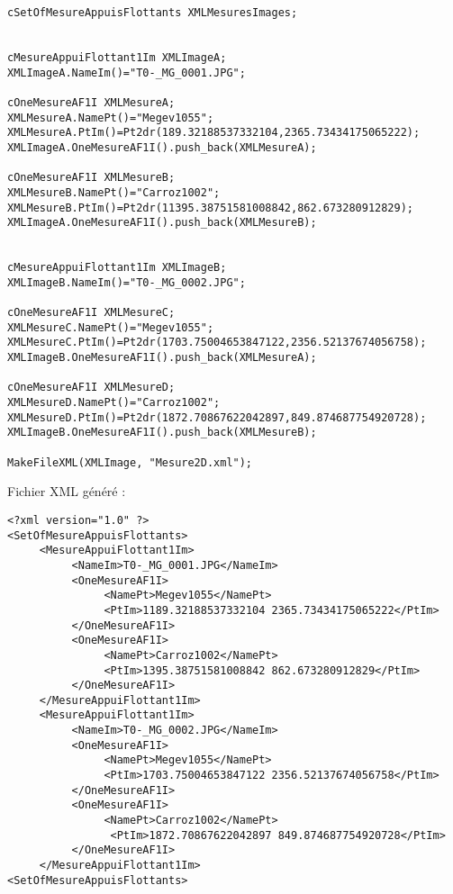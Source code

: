 \documentclass{article}
\begin{document}
\begin{verbatim}
cSetOfMesureAppuisFlottants XMLMesuresImages;
  

cMesureAppuiFlottant1Im XMLImageA;
XMLImageA.NameIm()="T0-_MG_0001.JPG";

cOneMesureAF1I XMLMesureA;
XMLMesureA.NamePt()="Megev1055";
XMLMesureA.PtIm()=Pt2dr(189.32188537332104,2365.73434175065222);
XMLImageA.OneMesureAF1I().push_back(XMLMesureA);

cOneMesureAF1I XMLMesureB;
XMLMesureB.NamePt()="Carroz1002";
XMLMesureB.PtIm()=Pt2dr(11395.38751581008842,862.673280912829);
XMLImageA.OneMesureAF1I().push_back(XMLMesureB);
			

cMesureAppuiFlottant1Im XMLImageB;
XMLImageB.NameIm()="T0-_MG_0002.JPG";

cOneMesureAF1I XMLMesureC;
XMLMesureC.NamePt()="Megev1055";
XMLMesureC.PtIm()=Pt2dr(1703.75004653847122,2356.52137674056758);
XMLImageB.OneMesureAF1I().push_back(XMLMesureA);

cOneMesureAF1I XMLMesureD;
XMLMesureD.NamePt()="Carroz1002";
XMLMesureD.PtIm()=Pt2dr(1872.70867622042897,849.874687754920728);
XMLImageB.OneMesureAF1I().push_back(XMLMesureB);

MakeFileXML(XMLImage, "Mesure2D.xml");

\end{verbatim}


Fichier XML généré :

\begin{verbatim}
<?xml version="1.0" ?>
<SetOfMesureAppuisFlottants>
     <MesureAppuiFlottant1Im>
          <NameIm>T0-_MG_0001.JPG</NameIm>
          <OneMesureAF1I>
               <NamePt>Megev1055</NamePt>
               <PtIm>1189.32188537332104 2365.73434175065222</PtIm>
          </OneMesureAF1I>
          <OneMesureAF1I>
               <NamePt>Carroz1002</NamePt>
               <PtIm>1395.38751581008842 862.673280912829</PtIm>
          </OneMesureAF1I>
     </MesureAppuiFlottant1Im>
     <MesureAppuiFlottant1Im>
          <NameIm>T0-_MG_0002.JPG</NameIm>
          <OneMesureAF1I>
               <NamePt>Megev1055</NamePt>
               <PtIm>1703.75004653847122 2356.52137674056758</PtIm>
          </OneMesureAF1I>
          <OneMesureAF1I>
               <NamePt>Carroz1002</NamePt>
                <PtIm>1872.70867622042897 849.874687754920728</PtIm>
          </OneMesureAF1I>
     </MesureAppuiFlottant1Im>
<SetOfMesureAppuisFlottants>
\end{verbatim}
\end{document}
